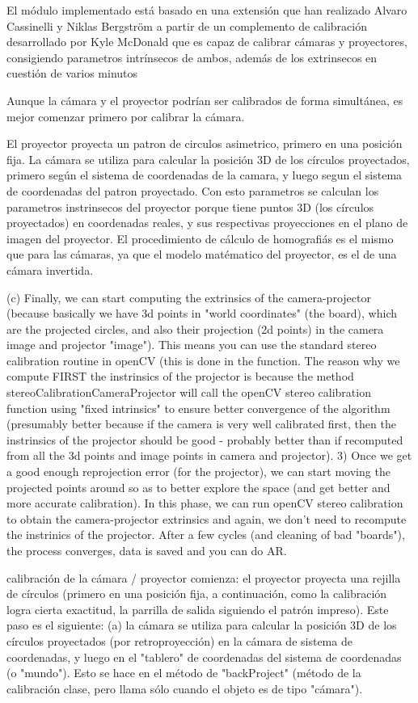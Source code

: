 El módulo implementado está basado en una extensión que han realizado Alvaro Cassinelli y Niklas Bergström a partir de un complemento de calibración desarrollado por Kyle McDonald que es capaz de calibrar cámaras y proyectores, consigiendo parametros intrínsecos de ambos, además de los extrinsecos en cuestión de varios minutos 

Aunque la cámara y el proyector podrían ser calibrados de forma simultánea, es mejor comenzar primero por calibrar la cámara.

El proyector proyecta un patron de circulos asimetrico, primero en una posición fija. La cámara se utiliza para calcular la posición 3D de los círculos proyectados, primero según el sistema de coordenadas de la camara, y luego segun el sistema de coordenadas del patron proyectado. Con esto parametros se calculan los parametros instrinsecos del proyector porque tiene puntos 3D (los círculos proyectados) en coordenadas reales, y sus respectivas proyecciones en el plano de imagen del proyector. El procedimiento de cálculo de homografiás es el mismo que para las cámaras, ya que el modelo matématico del proyector, es el de una cámara invertida. 


(c) Finally, we can start computing the extrinsics of the camera-projector (because basically we have 3d points in "world coordinates" (the board), which are the projected circles, and also their projection (2d points) in the camera image and projector "image"). This means you can use the standard stereo calibration routine in openCV (this is done in the function. The reason why we compute FIRST the instrinsics of the projector is because the method stereoCalibrationCameraProjector will call the openCV stereo calibration function using "fixed intrinsics" to ensure better convergence of the algorithm (presumably better because if the camera is very well calibrated first, then the instrinsics of the projector should be good - probably better than if recomputed from all the 3d points and image points in camera and projector). 
3) Once we get a good enough reprojection error (for the projector), we can start moving the projected points around so as to better explore the space (and get better and more accurate calibration). In this phase, we can run openCV stereo calibration to obtain the camera-projector extrinsics and again, we don't need to recompute the instrinics of the projector. After a few cycles (and cleaning of bad "boards"), the process converges, data is saved and you can do AR. 


calibración de la cámara / proyector comienza: el proyector proyecta una rejilla de círculos (primero en una posición fija, a continuación, como la calibración logra cierta exactitud, la parrilla de salida siguiendo el patrón impreso). Este paso es el siguiente: (a) la cámara se utiliza para calcular la posición 3D de los círculos proyectados (por retroproyección) en la cámara de sistema de coordenadas, y luego en el "tablero" de coordenadas del sistema de coordenadas (o "mundo"). Esto se hace en el método de "backProject" (método de la calibración clase, pero llama sólo cuando el objeto es de tipo "cámara"). 

